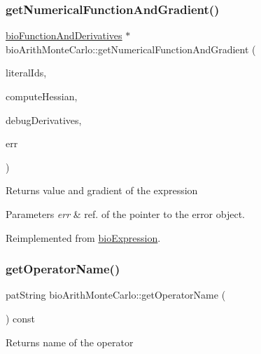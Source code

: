 \subsubsection{\texorpdfstring{get\+Numerical\+Function\+And\+Gradient()}{getNumericalFunctionAndGradient()}}
{\footnotesize\ttfamily \hyperlink{classbio_function_and_derivatives}{bio\+Function\+And\+Derivatives} $\ast$ bio\+Arith\+Monte\+Carlo\+::get\+Numerical\+Function\+And\+Gradient (\begin{DoxyParamCaption}\item[{vector$<$ pat\+U\+Long $>$}]{literal\+Ids,  }\item[{pat\+Boolean}]{compute\+Hessian,  }\item[{pat\+Boolean}]{debug\+Derivatives,  }\item[{pat\+Error $\ast$\&}]{err }\end{DoxyParamCaption})\hspace{0.3cm}{\ttfamily [virtual]}}

\begin{DoxyReturn}{Returns}
value and gradient of the expression 
\end{DoxyReturn}

\begin{DoxyParams}{Parameters}
{\em err} & ref. of the pointer to the error object. \\
\hline
\end{DoxyParams}


Reimplemented from \hyperlink{classbio_expression_a91c81ce80c9e972c913b10f5f3c1ed13}{bio\+Expression}.

\mbox{\label{classbio_arith_monte_carlo_aa968b16e7b1982445c4aea9aee714d57}} 
\subsubsection{\texorpdfstring{get\+Operator\+Name()}{getOperatorName()}}
{\footnotesize\ttfamily pat\+String bio\+Arith\+Monte\+Carlo\+::get\+Operator\+Name (\begin{DoxyParamCaption}{ }\end{DoxyParamCaption}) const\hspace{0.3cm}{\ttfamily [virtual]}}

\begin{DoxyReturn}{Returns}
name of the operator 
\end{DoxyReturn}


